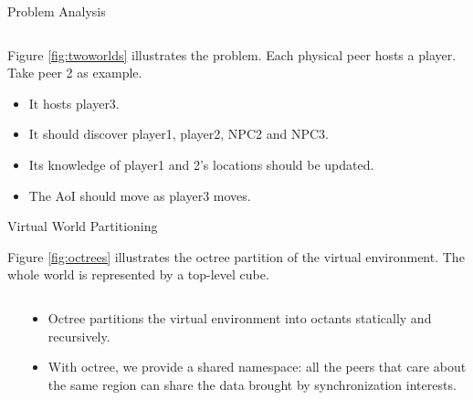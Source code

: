 \documentclass[final,hyperref={pdfpagelabels=false},20pt]{beamer}
\begin{document}
\begin{frame}[t]
\begin{columns}[t]
\begin{column}{.465\textwidth}
\begin{block}{Problem Analysis}
\begin{columns}
\begin{column}{.52\textwidth}
\end{column}

\end{columns}

\begin{column}{.01\textwidth}
\end{column}

Figure \ref{fig:twoworlds} illustrates the problem. \newline
Each physical peer hosts a player. Take peer 2 as example.
\begin{itemize}
\item It hosts player3.
\item It should discover player1, player2, NPC2 and NPC3.
\item Its knowledge of player1 and 2's locations should be updated.
\item The AoI should move as player3 moves.
\end{itemize}
\end{block}


\begin{block}{Virtual World Partitioning}

Figure \ref{fig:octrees} illustrates the octree partition of the virtual environment. \newline
The whole world is represented by a top-level cube.
\begin{columns}

\begin{column}{.01\textwidth}
\end{column}

\begin{column}{.50\textwidth}
\begin{itemize}
\item Octree partitions the virtual environment into octants statically and recursively. 
\item With octree, we provide a shared namespace: all the peers that care about the same region can share the data brought by synchronization interests.
\end{itemize}
\end{column}


\end{columns}
\end{block}
\end{column}
\end{columns}
\end{frame}
\end{document}
